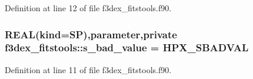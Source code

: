Definition at line 12 of file f3dex\_\-fitstools.f90.

\hypertarget{namespacef3dex__fitstools_a7841ef704a851792da5858a872caa0e4}{
\subsubsection[{s\_\-bad\_\-value}]{\setlength{\rightskip}{0pt plus 5cm}REAL(kind=SP),parameter,private {\bf f3dex\_\-fitstools::s\_\-bad\_\-value} = HPX\_\-SBADVAL}}
\label{namespacef3dex__fitstools_a7841ef704a851792da5858a872caa0e4}


Definition at line 11 of file f3dex\_\-fitstools.f90.

